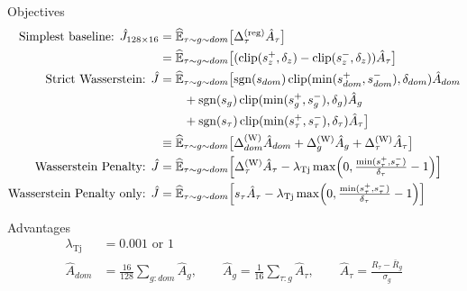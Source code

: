 \documentclass{article}
\begin{document}
Objectives
\begin{align*}
\text{Simplest baseline: }\hat J_{128\times 16}
  &= \widehat{\mathbb{E}}_{\tau\sim g\sim dom}\bigl[\Delta_\tau^{(\text{reg})}\hat A_\tau\bigr] \\
  &= \widehat{\mathbb{E}}_{\tau\sim g\sim dom}\bigl[(\operatorname{clip}(s_z^+,\delta_z) - \operatorname{clip}(s_z^-,\delta_z))\hat A_\tau\bigr] \\
\text{Strict Wasserstein: }\hat J
  &= \widehat{\mathbb{E}}_{\tau\sim g\sim dom}\bigl[\operatorname{sgn}(s_{dom})\operatorname{clip}(\min(s_{dom}^+,s_{dom}^-),\delta_{dom})\hat A_{dom} \\
  &\qquad + \operatorname{sgn}(s_g)\operatorname{clip}(\min(s_g^+,s_g^-),\delta_g)\hat A_g \\
  &\qquad + \operatorname{sgn}(s_\tau)\operatorname{clip}(\min(s_\tau^+,s_\tau^-),\delta_\tau)\hat A_\tau\bigr] \\
  &\equiv \widehat{\mathbb{E}}_{\tau\sim g\sim dom}\bigl[\Delta_{dom}^{(\text{W})}\hat A_{dom} + \Delta_g^{(\text{W})}\hat A_g + \Delta_\tau^{(\text{W})}\hat A_\tau\bigr] \\
\text{Wasserstein Penalty: }\hat J
  &= \widehat{\mathbb{E}}_{\tau\sim g\sim dom}\Bigl[\Delta_\tau^{(\text{W})}\hat A_\tau - \lambda_{\operatorname{Tj}}\max\Bigl(0,\tfrac{\min(s_\tau^+,s_\tau^-)}{\delta_\tau} - 1\Bigr)\Bigr] \\
\text{Wasserstein Penalty only: }\hat J
  &= \widehat{\mathbb{E}}_{\tau\sim g\sim dom}\Bigl[s_\tau \hat A_\tau - \lambda_{\operatorname{Tj}}\max\Bigl(0,\tfrac{\min(s_\tau^+,s_\tau^-)}{\delta_\tau} - 1\Bigr)\Bigr]
\end{align*}

Advantages
\begin{align*}
\lambda_{\operatorname{Tj}} &= 0.001 \text{ or } 1 \\
\hat A_{dom} &= \tfrac{16}{128}\sum_{g:dom}\hat A_g, \qquad
\hat A_g = \tfrac{1}{16}\sum_{\tau:g}\hat A_\tau, \qquad
\hat A_\tau = \frac{R_\tau - \bar R_g}{\sigma_g}
\end{align*}
\end{document}
